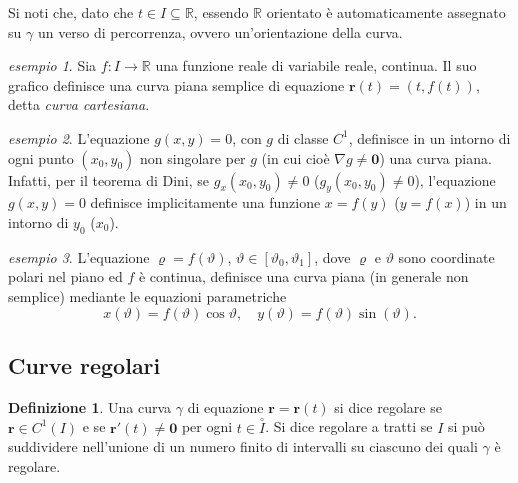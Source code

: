 \documentclass[a4paper]{book}
\numberwithin{equation}{section}
\renewcommand{\theta}{\vartheta}
\renewcommand{\rho}{\varrho}
\theoremstyle{plain}
\theoremstyle{definition}
\newtheorem{defn}{Definizione}[section]
\theoremstyle{remark}
\renewcommand{\vec}{\boldsymbol}
\theoremstyle{example}
\newtheorem{exmp}{esempio}[section]
\begin{document}
Si noti che, dato che $t \in I \subseteq \mathbb{R}$, essendo $\mathbb{R}$ orientato è automaticamente assegnato su $\gamma$ un verso di percorrenza, ovvero un'orientazione della curva.

\begin{exmp}
Sia $f \colon I \to \mathbb{R}$ una funzione reale di variabile reale, continua. Il suo grafico definisce una curva piana semplice di equazione $\vec{r}(t) = (t, f(t))$, detta \emph{curva cartesiana}.
\end{exmp}

\begin{exmp}
L'equazione $g(x, y) = 0$, con $g$ di classe $C^1$, definisce in un intorno di ogni punto $(x_0, y_0)$ non singolare per $g$ (in cui cioè $\nabla g \ne \vec{0}$) una curva piana. Infatti, per il teorema di Dini, se $g_x(x_0, y_0) \ne 0$ ($g_y(x_0, y_0) \ne 0$), l'equazione $g(x, y) = 0$ definisce implicitamente una funzione $x = f(y)$ ($y = f(x)$) in un intorno di $y_0$ ($x_0$).
\end{exmp}

\begin{exmp}
L'equazione $\rho = f(\theta)$, $\theta \in [\theta_0, \theta_1]$, dove $\rho$ e $\theta$ sono coordinate polari nel piano ed $f$ è continua, definisce una curva piana (in generale non semplice) mediante le equazioni parametriche
	\begin{equation*}
	x(\theta) = f(\theta)\cos\theta, \quad y(\theta) = f(\theta)\sin(\theta).
	\end{equation*}
\end{exmp}

\subsection{Curve regolari}
\begin{defn}
Una curva $\gamma$ di equazione $\vec{r} = \vec{r}(t)$ si dice regolare se $\vec{r} \in C^1(I)$ e se $\vec{r}'(t) \ne \vec{0}$ per ogni $t \in \overset{\circ}{I}$. Si dice regolare a tratti se $I$ si può suddividere nell'unione di un numero finito di intervalli su ciascuno dei quali $\gamma$ è regolare.
\end{defn}
\end{document}
